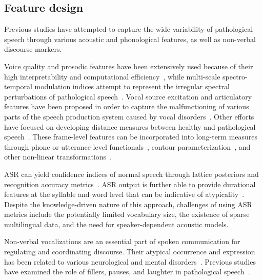 \documentclass{article}
\begin{document}
\subsection{Feature design}
Previous studies have attempted to capture the wide variability of pathological speech through various acoustic and phonological features, as well as non-verbal discourse markers.

Voice quality and prosodic features have been extensively used because of their high interpretability and computational efficiency~\cite{van2010computational,tsanas2012novel,bone2014psychologist}, while multi-scale spectro-temporal modulation indices attempt to represent the irregular spectral perturbations of pathological speech~\cite{liss2010discriminating,falk2012characterization,williamson2015automatic}. Vocal source excitation and articulatory features have been proposed in order to capture the malfunctioning of various parts of the speech production system caused by vocal disorders~\cite{falk2012characterization,hahm2015parkinson}. Other efforts have focused on developing distance measures between healthy and pathological speech~\cite{gu2005disordered}. These frame-level features can be incorporated into long-term measures through phone or utterance level functionals~\cite{kim2015automatic}, contour parameterization~\cite{kim2015automatic2}, and other non-linear transformations~\cite{kim2015automatic,an2015automatic,middag2011combining}.

ASR can yield confidence indices of normal speech through lattice posteriors and recognition accuracy metrics~\cite{kim2015automatic,zlotnik2015random,maier2009peaks,sharma2009universal,middag2009automated}. ASR output is further able to provide durational features at the syllable and word level that can be indicative of atypicality~\cite{an2015automatic,duez2006consonant}. Despite the knowledge-driven nature of this approach, challenges of using ASR metrics include the potentially limited vocabulary size, the existence of sparse multilingual data, and the need for speaker-dependent acoustic models.

Non-verbal vocalizations are an essential part of spoken communication for regulating and coordinating discourse. Their atypical occurrence and expression has been related to various neurological and mental disorders~\cite{lake2011listener}. Previous studies have examined the role of fillers, pauses, and laughter in pathological speech~\cite{heeman2010autism,lake2011listener,gupta2014predicting}.
\end{document}
